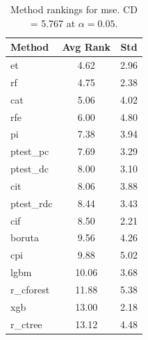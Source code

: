 \begin{table}[h]
\centering
\caption{Method rankings for mse. CD = 5.767 at $\alpha=0.05$.}
\label{tab:ranks_mse}
\begin{tabular}{lcc}
\toprule
Method & Avg Rank & Std \\
\midrule
et & 4.62 & 2.96 \\
rf & 4.75 & 2.38 \\
cat & 5.06 & 4.02 \\
rfe & 6.00 & 4.80 \\
pi & 7.38 & 3.94 \\
ptest_pc & 7.69 & 3.29 \\
ptest_dc & 8.00 & 3.10 \\
cit & 8.06 & 3.88 \\
ptest_rdc & 8.44 & 3.43 \\
cif & 8.50 & 2.21 \\
boruta & 9.56 & 4.26 \\
cpi & 9.88 & 5.02 \\
lgbm & 10.06 & 3.68 \\
r_cforest & 11.88 & 5.38 \\
xgb & 13.00 & 2.18 \\
r_ctree & 13.12 & 4.48 \\
\bottomrule
\end{tabular}
\end{table}